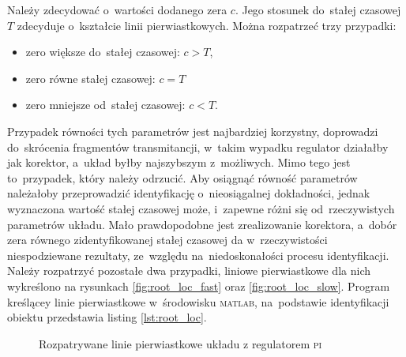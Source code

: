 \documentclass[11pt]{article}
\begin{document}
Należy zdecydować o~wartości dodanego zera $ c $. Jego stosunek do~stałej czasowej $ T $ zdecyduje o~kształcie linii pierwiastkowych.
Można rozpatrzeć trzy przypadki:
\begin{itemize}
	\item zero większe do~stałej czasowej: $ c > T $,
	\item zero równe stałej czasowej: $ c = T $
	\item zero mniejsze od~stałej czasowej: $ c < T $.
\end{itemize}
Przypadek równości tych parametrów jest najbardziej korzystny, doprowadzi do~skrócenia fragmentów transmitancji, w~takim wypadku regulator działałby jak korektor, a~układ byłby najszybszym z~możliwych.
Mimo tego jest to~przypadek, który należy odrzucić.
Aby osiągnąć równość parametrów należałoby przeprowadzić identyfikację o~nieosiągalnej dokładności, jednak wyznaczona wartość stałej czasowej może, i~zapewne różni się od~rzeczywistych parametrów układu.
Mało prawdopodobne jest zrealizowanie korektora, a~dobór zera równego zidentyfikowanej stałej czasowej da w~rzeczywistości niespodziewane rezultaty, ze~względu na~niedoskonałości procesu identyfikacji.
Należy rozpatrzyć pozostałe dwa przypadki, liniowe pierwiastkowe dla nich wykreślono na rysunkach \ref{fig:root_loc_fast} oraz \ref{fig:root_loc_slow}. Program kreślącey linie pierwiastkowe w~środowisku \textsc{matlab}, na~podstawie identyfikacji obiektu przedstawia listing \ref{lst:root_loc}.

\begin{figure}[!htbp] 
	\quad 
	\caption{Rozpatrywane linie pierwiastkowe układu z regulatorem \textsc{pi}} 
\end{figure}
\end{document}

